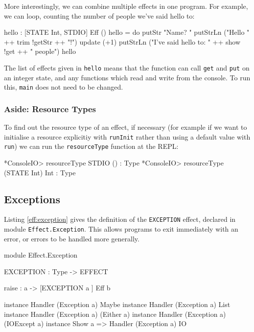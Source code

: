 \noindent
More interestingly, we can combine multiple effects in one program. For example,
we can loop, counting the number of people we've said hello to:

\begin{code}
hello : { [STATE Int, STDIO] } Eff ()
hello = do putStr "Name? "
           putStrLn ("Hello " ++ trim !getStr ++ "!")
           update (+1)
           putStrLn ("I've said hello to: " ++ show !get ++ " people")
           hello
\end{code}

\noindent
The list of effects given in \texttt{hello} means that the function can
call \texttt{get} and \texttt{put} on an integer state, and any functions
which read and write from the console. To run this, \texttt{main} does
not need to be changed.

\subsubsection*{Aside: Resource Types}

To find out the resource type of an effect, if necessary (for example if
we want to initialise a resource explicitiy with \texttt{runInit} rather than
using a default value with \texttt{run})
we can run the \texttt{resourceType} function at the \Idris{} REPL:

\begin{code}
*ConsoleIO> resourceType STDIO
() : Type
*ConsoleIO> resourceType (STATE Int)
Int : Type
\end{code}

\subsection{Exceptions}

Listing \ref{eff:exception} gives the definition of the \texttt{EXCEPTION}
effect, declared in module \texttt{Effect.Exception}. This allows programs
to exit immediately with an error, or errors to be handled more generally.

\begin{code}[float=h,frame=single,label=eff:exception,caption={Exception Effect}]
module Effect.Exception

EXCEPTION : Type -> EFFECT

raise : a -> { [EXCEPTION a ] } Eff b 

instance           Handler (Exception a) Maybe
instance           Handler (Exception a) List
instance           Handler (Exception a) (Either a)
instance           Handler (Exception a) (IOExcept a)
instance Show a => Handler (Exception a) IO
\end{code}


